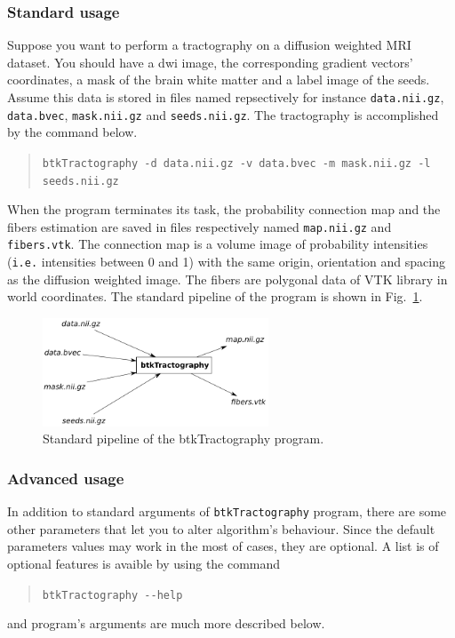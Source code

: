     \subsubsection*{Standard usage}
        Suppose you want to perform a tractography on a diffusion weighted MRI dataset. You should have a dwi image, the corresponding gradient vectors' coordinates, a mask of the brain white matter and a label image of the seeds. Assume this data is stored in files named repsectively for instance \texttt{data.nii.gz}, \texttt{data.bvec}, \texttt{mask.nii.gz} and \texttt{seeds.nii.gz}. The tractography is accomplished by the command below.
            \begin{quote}
                \texttt{btkTractography -d data.nii.gz -v data.bvec -m mask.nii.gz -l seeds.nii.gz}
            \end{quote}
        When the program terminates its task, the probability connection map and the fibers estimation are saved in files respectively named \texttt{map.nii.gz} and \texttt{fibers.vtk}. The connection map is a volume image of probability intensities (\texttt{i.e.} intensities between 0 and 1) with the same origin, orientation and spacing as the diffusion weighted image. The fibers are polygonal data of VTK library in world coordinates. The standard pipeline of the program is shown in Fig.~\ref{btkTractography-fig:standard-pipeline}.
            \begin{figure}
                \centering
                \includegraphics[width=0.6\textwidth]{btkTractographyPipeline}
                \caption{Standard pipeline of the btkTractography program.}
                \label{btkTractography-fig:standard-pipeline}
            \end{figure}

    \subsubsection*{Advanced usage}
        In addition to standard arguments of \texttt{btkTractography} program, there are some other parameters that let you to alter algorithm's behaviour. Since the default parameters values may work in the most of cases, they are optional. A list is of optional features is avaible by using the command
            \begin{quote}
                \texttt{btkTractography -\hspace{0.1mm}-help}
            \end{quote}
        and program's arguments are much more described below.


